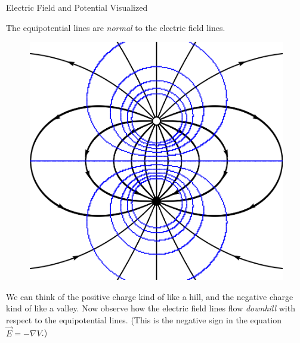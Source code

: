 \documentclass{beamer}
\begin{document}
\begin{frame}{Electric Field and Potential Visualized}

The equipotential lines are \emph{normal} to the electric field lines.

\begin{figure}[H]
\centering
\includegraphics[height=0.5\textheight]{figures/dipole_potential.png}
\end{figure}

We can think of the positive charge kind of like a hill, and the negative charge kind of like a valley. Now observe how the electric field lines flow \emph{downhill} with respect to the equipotential lines. (This is the negative sign in the equation $\vec{E} = -\nabla V$.)

\end{frame}
\end{document}
